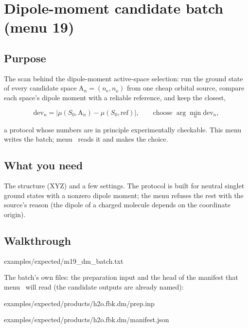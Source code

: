 \chapter{Dipole-moment candidate batch (menu 19)}
\label{ch:menu19}

\section{Purpose}

The scan behind the dipole-moment active-space selection: run the ground state
of every candidate space $\mathrm{A}_n = (n_\mathrm{e}, n_\mathrm{o})$ from one
cheap orbital source, compare each space's dipole moment with a reliable
reference, and keep the closest,

\[
\mathrm{dev}_n = \bigl| \mu(S_0, \mathrm{A}_n) - \mu(S_0, \mathrm{ref}) \bigr|,
\qquad \text{choose } \arg\min_n \mathrm{dev}_n ,
\]

a protocol whose numbers are in principle experimentally checkable.  This menu
writes the batch; menu~ reads it and makes the choice.

\section{What you need}

The structure (XYZ) and a few settings.  The protocol is built for neutral
singlet ground states with a nonzero dipole moment; the menu refuses the rest
with the source's reason (the dipole of a charged molecule depends on the
coordinate origin).

\section{Walkthrough}


  {examples/expected/m19_dm_batch.txt}

The batch's own files: the preparation input and the head of the manifest that
menu~ will read (the candidate outputs are already named):


  {examples/expected/products/h2o.fbk.dm/prep.inp}


  {examples/expected/products/h2o.fbk.dm/manifest.json}


